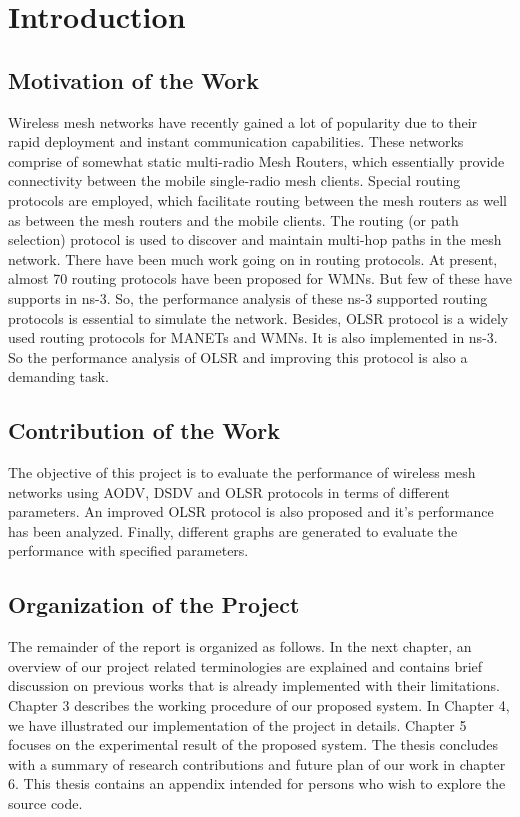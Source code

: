 \documentclass[12pt,a4paper]{report}
\begin{document}
\chapter{Introduction}
\section{Motivation of the Work}
Wireless mesh networks have recently gained a lot of popularity due to their rapid deployment and instant communication capabilities. These networks comprise of somewhat static multi-radio Mesh Routers, which essentially provide connectivity between the mobile single-radio mesh clients. Special routing protocols are employed, which facilitate routing between the mesh routers as well as between the mesh routers and the mobile clients. The routing (or path selection) protocol is used to discover and maintain multi-hop paths in the mesh network. There have been much work going on in routing protocols. At present, almost 70 routing protocols have been proposed for WMNs. But few of these have supports in ns-3. So, the performance analysis of these ns-3 supported routing protocols is essential to simulate the network. Besides, OLSR  protocol is a widely used routing protocols for MANETs and WMNs. It is also implemented in ns-3. So the performance analysis of OLSR and improving this protocol is also a demanding task.

\section{Contribution of the Work}
The objective of this project is to evaluate the performance of wireless mesh networks
using AODV, DSDV and OLSR protocols in terms of different parameters. 
An improved OLSR protocol is also proposed and it's performance has been analyzed. Finally, different graphs are generated to evaluate the performance with specified parameters.

\section{Organization of the Project}
The remainder of the report is organized as follows. In the next chapter, an overview of our project related terminologies are explained and contains brief discussion on previous works that is already implemented with their limitations. Chapter 3 describes the working procedure of our proposed system. In Chapter 4, we have illustrated our implementation of the project in details. Chapter 5 focuses on the experimental result of the proposed system. The thesis concludes with a summary of research contributions and future plan of our work in chapter 6. This thesis contains an appendix intended for persons who wish to explore the source code. 
\end{document}
